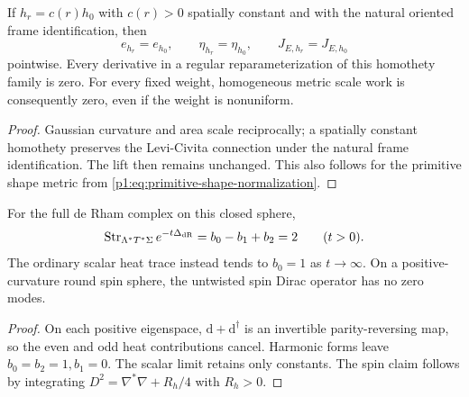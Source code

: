 \documentclass[11pt]{article}
\begin{document}
\begin{corollary}
\label{p1:cor:v2203-euler-homothety}
If \(h_r=c(r)h_0\) with \(c(r)>0\) spatially constant and with the
natural oriented frame identification, then
\[
 e_{h_r}=e_{h_0},\qquad \eta_{h_r}=\eta_{h_0},\qquad
 J_{E,h_r}=J_{E,h_0}
\]
pointwise. Every derivative in a regular reparameterization of this
homothety family is zero. For every fixed weight, homogeneous metric
scale work is consequently zero, even if the weight is nonuniform.
\end{corollary}
\begin{proof}
Gaussian curvature and area scale reciprocally; a spatially constant
homothety preserves the Levi-Civita connection under the natural frame
identification. The lift then remains unchanged. This also follows for
the primitive shape metric from
\eqref{p1:eq:primitive-shape-normalization}.
\end{proof}

\begin{proposition}
\label{p1:prop:v2203-euler-spectral-owner}
For the full de Rham complex on this closed sphere,
\[
 \operatorname{Str}_{\Lambda^*T^*\Sigma}e^{-t\Delta_{\rm dR}}
 =b_0-b_1+b_2=2\qquad(t>0).
\]
The ordinary scalar heat trace instead tends to \(b_0=1\) as
\(t\to\infty\). On a positive-curvature round spin sphere, the untwisted
spin Dirac operator has no zero modes.
\end{proposition}
\begin{proof}
On each positive eigenspace, \(\mathrm d+\mathrm d^\dagger\) is an
invertible parity-reversing map, so the even and odd heat contributions
cancel. Harmonic forms leave \(b_0=b_2=1,b_1=0\).
The scalar limit retains only constants. The spin claim follows by
integrating \(D^2=\nabla^*\nabla+R_h/4\) with \(R_h>0\).
\end{proof}
\end{document}
